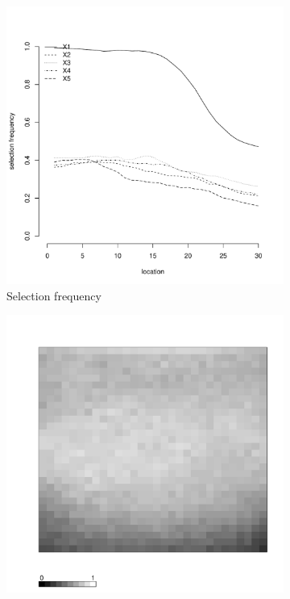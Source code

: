 \documentclass[authoryear, review, 11pt]{elsarticle}
\begin{document}
\begin{figure}
\begin{subfigure}[b]{0.45\textwidth}
		\includegraphics[width=\textwidth]{../../figures/simulation/15.26.profile_selection.pdf}
		\caption{Selection frequency}
	\end{subfigure}
	\begin{subfigure}[b]{0.45\textwidth}
	\centering
		\includegraphics[width=\textwidth]{../../figures/simulation/X1.15.26.unshrunk_bootstrap_coverage.pdf}

\end{subfigure}
\end{figure}
\end{document}
